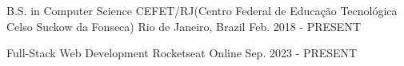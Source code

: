 

\begin{cventries}

  \cventry
    {B.S. in Computer Science} %
    {CEFET/RJ(Centro Federal de Educação Tecnológica Celso Suckow da Fonseca)} %
    {Rio de Janeiro, Brazil} %
    {Feb. 2018 - PRESENT} %
    {}

  \cventry
    {Full-Stack Web Development} %
    {Rocketseat} %
    {Online} %
    {Sep. 2023 - PRESENT} %
    {}

\end{cventries}
